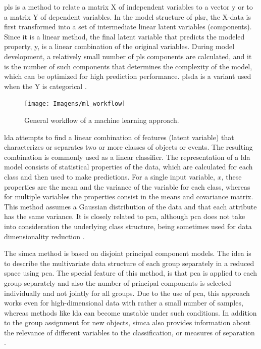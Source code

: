 \acrfull{pls} is a method to relate a matrix X of independent variables to a vector y or to a matrix Y of dependent variables. In the model structure of \gls{plsr}, the X-data is first transformed into a set of intermediate linear latent variables (components). Since it is a linear method, the final latent variable that predicts the modeled property, y, is a linear combination of the original variables. During model development, a relatively small number of \gls{pls} components are calculated, and it is the number of such components that determines the complexity of the model, which can be optimized for high prediction performance. \gls{plsda} is a variant used when the Y is categorical \citep{varmuza2009introduction}.

\begin{figure}
	\centering
	\texttt{[image: Imagens/ml\_workflow]}
	\caption{General workflow of a machine learning approach.}
	\label{ml_workflow}
\end{figure}

\gls{lda} attempts to find a linear combination of features (latent variable) that characterizes or separates two or more classes of objects or events. The resulting combination is commonly used as a linear classifier. The representation of a \gls{lda} model consists of statistical properties of the data, which are calculated for each class and then used to make predictions. For a single input variable, $ x $, these properties are the mean and the variance of the variable for each class, whereas for multiple variables the properties consist in the means and covariance matrix. This method assumes a Gaussian distribution of the data and that each attribute has the same variance. It is closely related to \gls{pca}, although \gls{pca} does not take into consideration the underlying class structure, being sometimes used for data dimensionality reduction \citep{martinez2001pca}.

The \gls{simca} method is based on disjoint principal component models. The idea is to describe the multivariate data structure of each group separately in a reduced space using \gls{pca}. The special feature of this method, is that \gls{pca} is applied to each group separately and also the number of principal components is selected individually and not jointly for all groups.  Due to the use of \gls{pca}, this approach works even for high-dimensional data with rather a small number of samples, whereas methods like \gls{lda} can become unstable under such conditions. In addition to the group assignment for new objects, \gls{simca} also provides information about the relevance of different variables to the classification, or measures of separation \citep{varmuza2009introduction}.

